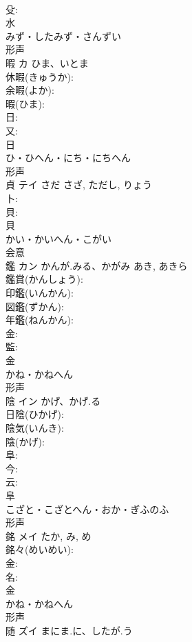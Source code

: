 \documentclass[8pt]{extreport}
\begin{document}
\begin{CJK}{UTF8}{min}
\\	殳: 
\\	水	
\\	みず・したみず・さんずい	
\\	形声 
\\	暇	カ	ひま、いとま		
\\	休暇(きゅうか): 
\\	余暇(よか): 
\\	暇(ひま): 
\\	日: 
\\	又: 
\\	日	
\\	ひ・ひへん・にち・にちへん	
\\	形声 
\\	貞	テイ	さだ	さざ, ただし, りょう	
\\	卜: 
\\	貝: 
\\	貝	
\\	かい・かいへん・こがい	
\\	会意 
\\	鑑	カン	かんが.みる、かがみ	あき, あきら	
\\	鑑賞(かんしょう): 
\\	印鑑(いんかん): 
\\	図鑑(ずかん): 
\\	年鑑(ねんかん): 
\\	金: 
\\	監: 
\\	金	
\\	かね・かねへん	
\\	形声 
\\	陰	イン	かげ、かげ.る		
\\	日陰(ひかげ): 
\\	陰気(いんき): 
\\	陰(かげ): 
\\	阜: 
\\	今: 
\\	云: 
\\	阜	
\\	こざと・こざとへん・おか・ぎふのふ	
\\	形声 
\\	銘	メイ		たか, み, め	
\\	銘々(めいめい): 
\\	金: 
\\	名: 
\\	金	
\\	かね・かねへん	
\\	形声 
\\	随	ズイ	まにま.に、したが.う		

\end{CJK}
\end{document}
